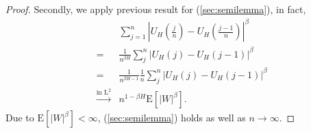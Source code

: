 \documentclass[a4paper, twoside, 11pt]{article}
\theoremstyle{definition}
\newtheorem{lemma}[definition]{\scshape Lemma}
\begin{document}
\begin{proof}
	  Secondly, we apply previous result for (\ref{sec:semilemma}), in fact,
	  \begin{eqnarray*}
		  &&\sum_{j=1}^n |U_H(\frac{j}{n}) - U_H(\frac{j-1}{n})|^\beta\\
		  &=& \frac{1}{n^{\beta H}} \sum_{j}^n|U_H(j) - U_H(j-1)|^\beta\\
		  &=& \frac{1}{n^{\beta H-1}} \frac{1}{n}\sum_{j}^n|U_H(j) - U_H(j-1)|^\beta\\
		  &\overset{\text{in }\mathrm{L}^2}{\longrightarrow}& n^{1-\beta H}\mathrm{E}[|W|^\beta].
		\end{eqnarray*}
		Due to $\mathrm{E}[|W|^\beta] < \infty$, (\ref{sec:semilemma}) holds as well as $n\rightarrow \infty$.
  \end{proof}

\end{document}
